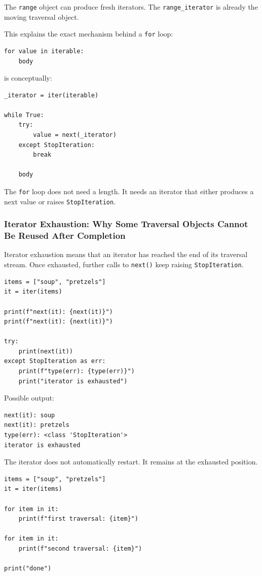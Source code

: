 The \texttt{range} object can produce fresh iterators. The \texttt{range\_iterator} is already the moving traversal object.

This explains the exact mechanism behind a \texttt{for} loop:

\begin{verbatim}
for value in iterable:
    body
\end{verbatim}

is conceptually:

\begin{verbatim}
_iterator = iter(iterable)

while True:
    try:
        value = next(_iterator)
    except StopIteration:
        break

    body
\end{verbatim}

The \texttt{for} loop does not need a length. It needs an iterator that either produces a next value or raises \texttt{StopIteration}.

\subsubsection{Iterator Exhaustion: Why Some Traversal Objects Cannot Be Reused After Completion}

Iterator exhaustion means that an iterator has reached the end of its traversal stream. Once exhausted, further calls to \texttt{next()} keep raising \texttt{StopIteration}.

\begin{verbatim}
items = ["soup", "pretzels"]
it = iter(items)

print(f"next(it): {next(it)}")
print(f"next(it): {next(it)}")

try:
    print(next(it))
except StopIteration as err:
    print(f"type(err): {type(err)}")
    print("iterator is exhausted")
\end{verbatim}

Possible output:

\begin{verbatim}
next(it): soup
next(it): pretzels
type(err): <class 'StopIteration'>
iterator is exhausted
\end{verbatim}

The iterator does not automatically restart. It remains at the exhausted position.

\begin{verbatim}
items = ["soup", "pretzels"]
it = iter(items)

for item in it:
    print(f"first traversal: {item}")

for item in it:
    print(f"second traversal: {item}")

print("done")
\end{verbatim}

